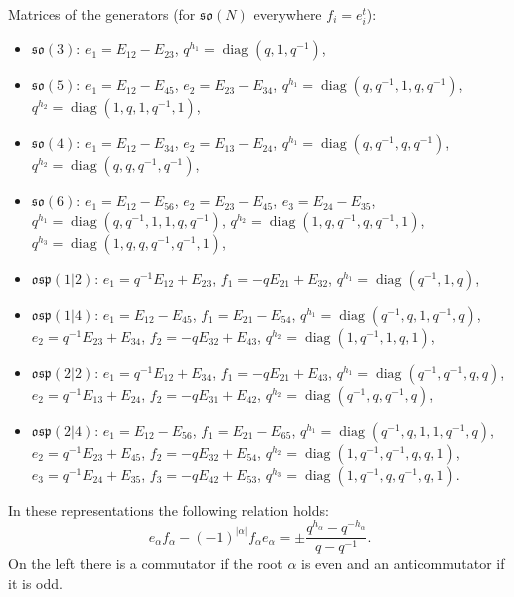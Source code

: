 \documentclass[12pt,a4paper]{article}
\newcommand{\so}{\mathfrak{so}}
\newcommand{\osp}{\mathfrak{osp}}
\newcommand{\diag}{\operatorname{diag}}
\begin{document}
Matrices of the generators (for $\so(N)$ everywhere $f_i=e_i^{t}$):
\begin{itemize}
\item $\so(3)$: $e_1=E_{12}-E_{23}$, $q^{h_1}=\diag(q,1,q^{-1})$,
\item $\so(5)$: $e_1=E_{12}-E_{45}$, $e_2=E_{23}-E_{34}$, $q^{h_1}=\diag(q,q^{-1},1,q,q^{-1})$, $q^{h_2}=\diag(1,q,1,q^{-1},1)$,
\item $\so(4)$: $e_1=E_{12}-E_{34}$, $e_2=E_{13}-E_{24}$, $q^{h_1}=\diag(q,q^{-1},q,q^{-1})$, $q^{h_2}=\diag(q,q,q^{-1},q^{-1})$,
\item $\so(6)$: $e_1=E_{12}-E_{56}$, $e_2=E_{23}-E_{45}$, $e_3=E_{24}-E_{35}$,
$q^{h_1}=\diag(q,q^{-1},1,1,q,q^{-1})$, $q^{h_2}=\diag(1,q,q^{-1},q,q^{-1},1)$, $q^{h_3}=\diag(1,q,q,q^{-1},q^{-1},1)$,
\item $\osp(1|2)$: $e_1=q^{-1}E_{12}+E_{23}$, $f_1=-qE_{21}+E_{32}$, $q^{h_1}=\diag(q^{-1},1,q)$,
\item $\osp(1|4)$: $e_1=E_{12}-E_{45}$, $f_1=E_{21}-E_{54}$, $q^{h_1}=\diag(q^{-1},q,1,q^{-1},q)$,
$e_2=q^{-1}E_{23}+E_{34}$, $f_2=-qE_{32}+E_{43}$, $q^{h_2}=\diag(1,q^{-1},1,q,1)$,
\item $\osp(2|2)$: $e_1=q^{-1}E_{12}+E_{34}$, $f_1=-qE_{21}+E_{43}$, $q^{h_1}=\diag(q^{-1},q^{-1},q,q)$,
$e_2=q^{-1}E_{13}+E_{24}$, $f_2=-qE_{31}+E_{42}$, $q^{h_2}=\diag(q^{-1},q,q^{-1},q)$,
\item $\osp(2|4)$: $e_1=E_{12}-E_{56}$, $f_1=E_{21}-E_{65}$, $q^{h_1}=\diag(q^{-1},q,1,1,q^{-1},q)$,
$e_2=q^{-1}E_{23}+E_{45}$, $f_2=-qE_{32}+E_{54}$, $q^{h_2}=\diag(1,q^{-1},q^{-1},q,q,1)$,
$e_3=q^{-1}E_{24}+E_{35}$, $f_3=-qE_{42}+E_{53}$, $q^{h_3}=\diag(1,q^{-1},q,q^{-1},q,1)$.
\end{itemize}
In these representations the following relation holds:
\[
e_\alpha f_\alpha-(-1)^{|\alpha|}f_\alpha e_\alpha=\pm\frac{q^{h_\alpha}-q^{-h_\alpha}}{q-q^{-1}} .
\]
On the left there is a commutator if the root $\alpha$ is even and an anticommutator if it is odd.
\end{document}
